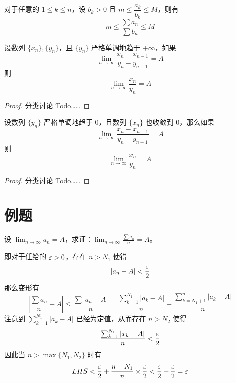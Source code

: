 \begin{theorem}
	对于任意的 $1 \leqslant k \leqslant n$，设 $b_k>0$ 且 $m \leqslant \dfrac{a_k}{b_k} \leqslant M$，则有
	$$m \leqslant \frac{\sum a_n}{\sum b_n} \leqslant M$$
\end{theorem}

\begin{theorem}
	设数列 $\{x_n\},\{y_n\}$，且 $\{y_n\}$ 严格单调地趋于 $+\infty$，如果
	$$\lim_{n\to \infty}\frac{x_n-x_{n-1}}{y_n-y_{n-1}}=A$$
	则
	$$\lim_{n\to \infty} \frac{x_n}{y_n} = A$$
\end{theorem}

\begin{proof}
	分类讨论 Todo……
\end{proof}

\begin{theorem}
	设数列 $\{y_n\}$ 严格单调地趋于 $0$，且数列 $\{x_n\}$ 也收敛到 $0$，那么如果
	$$\lim_{n\to \infty}\frac{x_n-x_{n-1}}{y_n-y_{n-1}}=A$$
	则
	$$\lim_{n\to \infty} \frac{x_n}{y_n} = A$$
\end{theorem}

\begin{proof}
	分类讨论 Todo……
\end{proof}

\section{例题}

\begin{problem}
	设 $\displaystyle\lim_{n\to\infty}a_n=A$，求证：$\displaystyle\lim_{n\to\infty}\frac{\sum a_n}{n}=A$。
\end{problem}

\begin{solution}
	即对于任给的 $\varepsilon>0$，存在 $n>N_1$ 使得
	$$|a_n-A|<\dfrac{\varepsilon}{2}$$
	那么变形有
	$$\left|\frac{\sum a_n}{n}-A\right| \leqslant \frac{\sum |a_n-A|}{n} = \frac{\sum_{k=1}^{N_1} |a_k-A|}{n} + \frac{\sum_{k=N_1+1}^{n} |a_k-A|}{n}$$
	注意到 $\sum_{k=1}^{N_1} |a_k-A|$ 已经为定值，从而存在 $n>N_2$ 使得
	$$\frac{\sum_{k=1}^{N_1}|x_k-A|}{n}<\frac{\varepsilon}{2}$$
	因此当 $n>\max\{N_1,N_2\}$ 时有
	$$LHS < \frac{\varepsilon}{2}+\frac{n-N_1}{n}\times \frac{\varepsilon}{2} < \frac{\varepsilon}{2}+\frac{\varepsilon}{2} = \varepsilon$$
\end{solution}